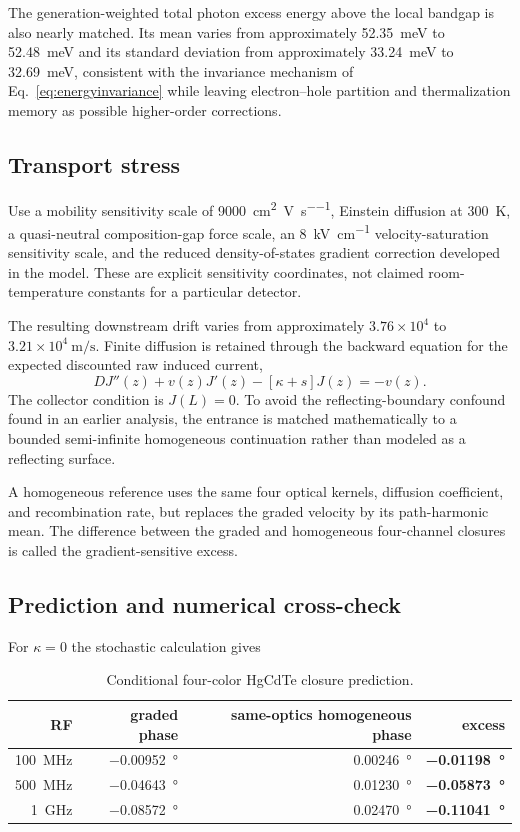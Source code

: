 \documentclass[11pt]{article}
\begin{document}
The generation-weighted total photon excess energy above the local bandgap is also nearly matched. Its mean varies from approximately \SI{52.35}{meV} to \SI{52.48}{meV} and its standard deviation from approximately \SI{33.24}{meV} to \SI{32.69}{meV}, consistent with the invariance mechanism of Eq.~\eqref{eq:energyinvariance} while leaving electron--hole partition and thermalization memory as possible higher-order corrections.

\subsection{Transport stress}

Use a mobility sensitivity scale of \SI{9000}{\centi\meter^2\per\volt\per\second}, Einstein diffusion at \SI{300}{K}, a quasi-neutral composition-gap force scale, an \SI{8}{kV\per\centi\meter} velocity-saturation sensitivity scale, and the reduced density-of-states gradient correction developed in the model. These are explicit sensitivity coordinates, not claimed room-temperature constants for a particular detector.

The resulting downstream drift varies from approximately $3.76\times10^4$ to $3.21\times10^4\ \mathrm{m/s}$. Finite diffusion is retained through the backward equation for the expected discounted raw induced current,
\begin{equation}
\boxed{
D J''(z)+v(z)J'(z)-[\kappa+s]J(z)=-v(z).}
\label{eq:hgbvp}
\end{equation}
The collector condition is $J(L)=0$. To avoid the reflecting-boundary confound found in an earlier analysis, the entrance is matched mathematically to a bounded semi-infinite homogeneous continuation rather than modeled as a reflecting surface.

A homogeneous reference uses the same four optical kernels, diffusion coefficient, and recombination rate, but replaces the graded velocity by its path-harmonic mean. The difference between the graded and homogeneous four-channel closures is called the gradient-sensitive excess.

\subsection{Prediction and numerical cross-check}

For $\kappa=0$ the stochastic calculation gives
\begin{table}[h]
\centering
\caption{Conditional four-color HgCdTe closure prediction.}
\begin{tabular}{rrrr}
\toprule
RF & graded phase & same-optics homogeneous phase & excess \\
\midrule
\SI{100}{MHz} & \SI{-0.00952}{\degree} & \SI{+0.00246}{\degree} & \textbf{\SI{-0.01198}{\degree}} \\
\SI{500}{MHz} & \SI{-0.04643}{\degree} & \SI{+0.01230}{\degree} & \textbf{\SI{-0.05873}{\degree}} \\
\SI{1}{GHz} & \SI{-0.08572}{\degree} & \SI{+0.02470}{\degree} & \textbf{\SI{-0.11041}{\degree}} \\
\bottomrule
\end{tabular}
\label{tab:hgclosure}
\end{table}
\end{document}
